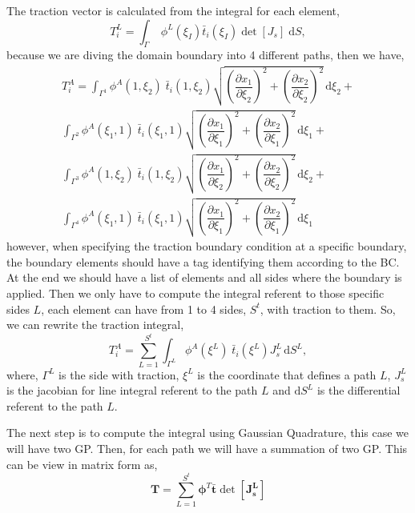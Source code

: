 \documentclass[11pt, a4paper]{article}
\numberwithin{equation}{section}
\begin{document}
The traction vector is calculated from the integral for each element,
\begin{equation}
T_i^L = \int_{\Gamma} \; \phi^L(\xi_I) \bar{t}_i(\xi_I) \det[J_s]\; \mathrm{d} S,
\end{equation}
because we are diving the domain boundary into 4 different paths, then we have,
\begin{multline*}
T_i^A=
\int_{\Gamma^1} \phi^A(1, \xi_2) \; \bar{t}_i(1, \xi_2) \sqrt{\left(\dfrac{\partial x_1}{\partial \xi_2}\right)^2 + \left(\dfrac{\partial x_2}{\partial \xi_2}\right)^2}\, \mathrm{d} \xi_2 
+ \\
\int_{\Gamma^2} \phi^A(\xi_1, 1) \; \bar{t}_i(\xi_1, 1) \sqrt{\left(\dfrac{\partial x_1}{\partial \xi_1}\right)^2 + \left(\dfrac{\partial x_2}{\partial \xi_1}\right)^2}\, \mathrm{d} \xi_1
+ \\
\int_{\Gamma^3} \phi^A(1, \xi_2)\;  \bar{t}_i(1, \xi_2) \sqrt{\left(\dfrac{\partial x_1}{\partial \xi_2}\right)^2 + \left(\dfrac{\partial x_2}{\partial \xi_2}\right)^2}\, \mathrm{d} \xi_2 
+ \\
\int_{\Gamma^4} \phi^A(\xi_1, 1) \; \bar{t}_i(\xi_1, 1) \sqrt{\left(\dfrac{\partial x_1}{\partial \xi_1}\right)^2 + \left(\dfrac{\partial x_2}{\partial \xi_1}\right)^2}\, \mathrm{d} \xi_1
\end{multline*}
however, when specifying the traction boundary condition at a specific boundary, the boundary elements should have a tag identifying them according to the BC. At the end we should have a list of elements and all sides where the boundary is applied. Then we only have to compute the integral referent to those specific sides $L$, each element can have from 1 to 4 sides, $S^t$, with traction  to them. So, we can rewrite the traction integral,
\begin{equation}
T_i^A= \sum_{L=1}^{S^t}
\int_{\Gamma^L} \phi^A(\xi^L) \; \bar{t}_i(\xi^L) J_s^L\, \mathrm{d} S^L,
\end{equation}
where, $\Gamma^L$ is the side with traction, $\xi^L$ is the coordinate that defines a path $L$, $J^L_s$ is the jacobian for line integral referent to the path $L$ and $\mathrm{d} S^L$ is the differential referent to the path $L$. 

The next step is to compute the integral using Gaussian Quadrature, this case we will have two GP. Then, for each path we will have a summation of two GP. This can be view in matrix form as,
\begin{equation}
\mathbf{T} = \sum_{L=1}^{S^t} \boldsymbol \phi^T  \mathbf{\bar{t}}  \det[\mathbf{J_s^L}]
\end{equation}
\end{document}
